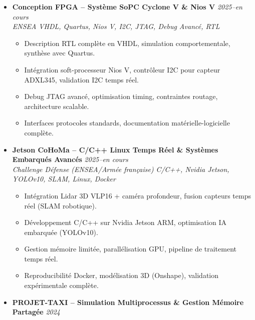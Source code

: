 \documentclass[a4paper,11pt]{article}
\begin{document}
\begin{itemize}[leftmargin=*, label={-}]
    \vspace{3pt}
    \item \textbf{Conception FPGA -- Syst\`eme SoPC Cyclone V \& Nios V} \hfill \textit{2025--en cours} \\
    \textit{ENSEA} \hfill \textit{VHDL, Quartus, Nios V, I2C, JTAG, Debug Avanc\'e, RTL}
    \vspace{-2pt}
        \begin{itemize}[leftmargin=0.4cm, nosep, label=\tiny$\bullet$]
            \item \small{Description RTL compl\`ete en VHDL, simulation comportementale, synth\`ese avec Quartus.}
            \item \small{Intégration soft-processeur Nios V, contrôleur I2C pour capteur ADXL345, validation I2C temps r\'eel.}
            \item \small{Debug JTAG avanc\'e, optimisation timing, contraintes routage, architecture scalable.}
            \item \small{Interfaces protocoles standards, documentation mat\'erielle-logicielle compl\`ete.}
        \end{itemize}
    \vspace{3pt}
    \item \textbf{Jetson CoHoMa -- C/C++ Linux Temps R\'eel \& Syst\`emes Embarqu\'es Avanc\'es} \hfill \textit{2025--en cours} \\
    \textit{Challenge D\'efense (ENSEA/Arm\'ee fran\c{c}aise)} \hfill \textit{C/C++, Nvidia Jetson, YOLOv10, SLAM, Linux, Docker}
    \vspace{-2pt}
        \begin{itemize}[leftmargin=0.4cm, nosep, label=\tiny$\bullet$]
            \item \small{Intégration Lidar 3D VLP16 + caméra profondeur, fusion capteurs temps r\'eel (SLAM robotique).}
            \item \small{Développement C/C++ sur Nvidia Jetson ARM, optimisation IA embarqu\'ee (YOLOv10).}
            \item \small{Gestion mémoire limit\'ee, parallélisation GPU, pipeline de traitement temps r\'eel.}
            \item \small{Reproducibilité Docker, modélisation 3D (Onshape), validation exp\'erimentale compl\`ete.}
        \end{itemize}
    \vspace{3pt}
    \item \textbf{PROJET-TAXI -- Simulation Multiprocessus \& Gestion M\'emoire Partag\'ee} \hfill \textit{2024} \\

\end{itemize}
\end{document}
